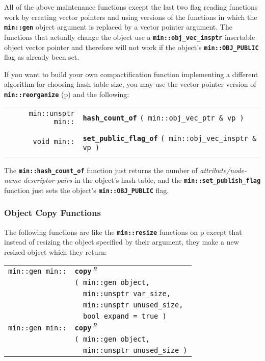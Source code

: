 \documentclass[12pt]{article}
\makeatletter
\newcommand{\TT}[1]{{\tt \bfseries #1}}
\newcommand{\ttindex}[1]{\index{#1@{\tt #1}}}
\newcommand{\pagref}[1]{p\pageref{#1}}
\newcommand{\EOL}{\penalty \exhyphenpenalty}
\newenvironment{indpar}[1][0.3in]%
	{\begin{list}{}%
		     {\setlength{\itemsep}{0in}%
		      \setlength{\topsep}{0in}%
		      \setlength{\parsep}{1ex}%
		      \setlength{\labelwidth}{#1}%
		      \setlength{\leftmargin}{#1}%
		      \addtolength{\leftmargin}{\labelsep}}%
	 \item}%
	{\end{list}}
\newcommand{\LABEL}[1]{\label{#1}}
\newlength{\ARGBREAKLENGTH}
\newcommand{\ARGBREAK}[1][\ARGBREAKLENGTH]{\\&\hspace*{#1}}
\newcommand{\MINKEY}[1]%
	   {\TT{#1}\ttindex{min::#1}\ttindex{#1}}
\newcommand{\REL}{$\,^R$}
\makeatother
\begin{document}
All of the above maintenance functions except the last two
flag reading functions work by creating
vector pointers and using versions of the functions in which the
\TT{min::gen} object argument is replaced by a vector pointer argument.
The functions that actually change the object use a
\TT{min::\EOL obj\_\EOL vec\_\EOL insptr} insertable object
vector pointer and therefore will not work if the object's
\TT{min::\EOL OBJ\_\EOL PUBLIC} flag as already been set.

If you want to build your own compactification function implementing
a different algorithm for choosing hash table size, you may use
the vector pointer version of \TT{min::reorganize}
(\pagref{MIN::REORGANIZE_OBJ_VEC_INSPTR}) and the following:

\begin{indpar}\begin{tabular}{r@{}l}
\verb|min::unsptr min::| & \MINKEY{hash\_count\_of}
    \verb|( min::obj_vec_ptr & vp )| \\
\LABEL{MIN::HASH_COUNT_OF} \\
\verb|void min::| & \MINKEY{set\_public\_flag\_of}
    \verb|( min::obj_vec_insptr & vp )| \\
\LABEL{MIN::SET_PUBLIC_FLAG_OF} \\
\end{tabular}\end{indpar}

The \TT{min::hash\_count\_of} function just returns the number of
{\em attribute/node-name-descrip\-tor-pairs} in the object's hash table,
and the \TT{min::\EOL set\_\EOL publish\_\EOL flag} function just sets
the object's \TT{min::\EOL OBJ\_\EOL PUBLIC} flag.

\subsubsection{Object Copy Functions}
\label{OBJECT-COPY-FUNCTIONS}

The following functions are like the \TT{min::\EOL resize} functions on
\pagref{MIN::RESIZE} except that instead of resizing the object specified
by their argument, they make a new resized object which they return:

\begin{indpar}\begin{tabular}{r@{}l}
\verb|min::gen min::| & \MINKEY{copy\REL}\ARGBREAK
    \verb|( min::gen object,|\ARGBREAK
    \verb|  min::unsptr var_size,|\ARGBREAK
    \verb|  min::unsptr unused_size,|\ARGBREAK
    \verb|  bool expand = true )|
\LABEL{MIN::COPY} \\
\verb|min::gen min::| & \MINKEY{copy\REL}\ARGBREAK
    \verb|( min::gen object,|\ARGBREAK
    \verb|  min::unsptr unused_size )|
\LABEL{MIN::COPY_UNUSED} \\
\end{tabular}\end{indpar}
\end{document}
